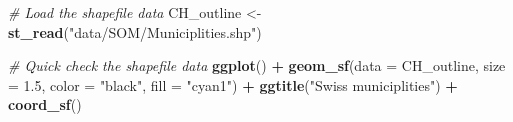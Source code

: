 \documentclass[
]{article}
\newenvironment{Shaded}{\begin{snugshade}}{\end{snugshade}}
\newcommand{\AttributeTok}[1]{\textcolor[rgb]{0.13,0.29,0.53}{#1}}
\newcommand{\CommentTok}[1]{\textcolor[rgb]{0.56,0.35,0.01}{\textit{#1}}}
\newcommand{\DecValTok}[1]{\textcolor[rgb]{0.00,0.00,0.81}{#1}}
\newcommand{\FloatTok}[1]{\textcolor[rgb]{0.00,0.00,0.81}{#1}}
\newcommand{\FunctionTok}[1]{\textcolor[rgb]{0.13,0.29,0.53}{\textbf{#1}}}
\newcommand{\NormalTok}[1]{#1}
\newcommand{\OtherTok}[1]{\textcolor[rgb]{0.56,0.35,0.01}{#1}}
\newcommand{\SpecialCharTok}[1]{\textcolor[rgb]{0.81,0.36,0.00}{\textbf{#1}}}
\newcommand{\StringTok}[1]{\textcolor[rgb]{0.31,0.60,0.02}{#1}}
\begin{document}
\begin{Shaded}
\begin{Highlighting}[]
\CommentTok{\# Load the shapefile data}
\NormalTok{CH\_outline }\OtherTok{\textless{}{-}} \FunctionTok{st\_read}\NormalTok{(}\StringTok{"data/SOM/Municiplities.shp"}\NormalTok{)}

\CommentTok{\# Quick check the shapefile data}
\FunctionTok{ggplot}\NormalTok{() }\SpecialCharTok{+} 
  \FunctionTok{geom\_sf}\NormalTok{(}\AttributeTok{data =}\NormalTok{ CH\_outline, }\AttributeTok{size =} \FloatTok{1.5}\NormalTok{, }\AttributeTok{color =} \StringTok{"black"}\NormalTok{, }\AttributeTok{fill =} \StringTok{"cyan1"}\NormalTok{) }\SpecialCharTok{+} 
  \FunctionTok{ggtitle}\NormalTok{(}\StringTok{"Swiss municiplities"}\NormalTok{) }\SpecialCharTok{+} 
  \FunctionTok{coord\_sf}\NormalTok{()}
\end{Highlighting}
\end{Shaded}

\begin{Shaded}
\end{Shaded}
\end{document}
